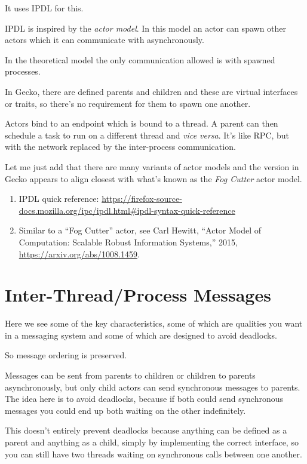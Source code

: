 \documentclass{article}
\begin{document}
It uses IPDL for this.

IPDL is inspired by the {\it actor model}. In this model an actor can spawn other actors which it can communicate with asynchronously.

In the theoretical model the only communication allowed is with spawned processes.

In Gecko, there are defined parents and children and these are virtual interfaces or traits, so there's no requirement for them to spawn one another.

Actors bind to an endpoint which is bound to a thread. A parent can then schedule a task to run on a different thread and {\it vice versa}. It's like RPC, but with the network replaced by the inter-process communication.

Let me just add that there are many variants of actor models and the version in Gecko appears to align closest with what's known as the {\it Fog Cutter\/} actor model.

\begin{enumerate}
\item IPDL quick reference: \url{https://firefox-source-docs.mozilla.org/ipc/ipdl.html\#ipdl-syntax-quick-reference}
\item Similar to a ``Fog Cutter'' actor, see Carl Hewitt, ``Actor Model of Computation: Scalable Robust Information Systems,'' 2015, \url{https://arxiv.org/abs/1008.1459}.
\end{enumerate}


\section{Inter-Thread/Process Messages}

Here we see some of the key characteristics, some of which are qualities you want in a messaging system and some of which are designed to avoid deadlocks.

So message ordering is preserved.

Messages can be sent from parents to children or children to parents asynchronously, but only child actors can send synchronous messages to parents. The idea here is to avoid deadlocks, because if both could send synchronous messages you could end up both waiting on the other indefinitely.

This doesn't entirely prevent deadlocks because anything can be defined as a parent and anything as a child, simply by implementing the correct interface, so you can still have two threads waiting on synchronous calls between one another.
\end{document}
